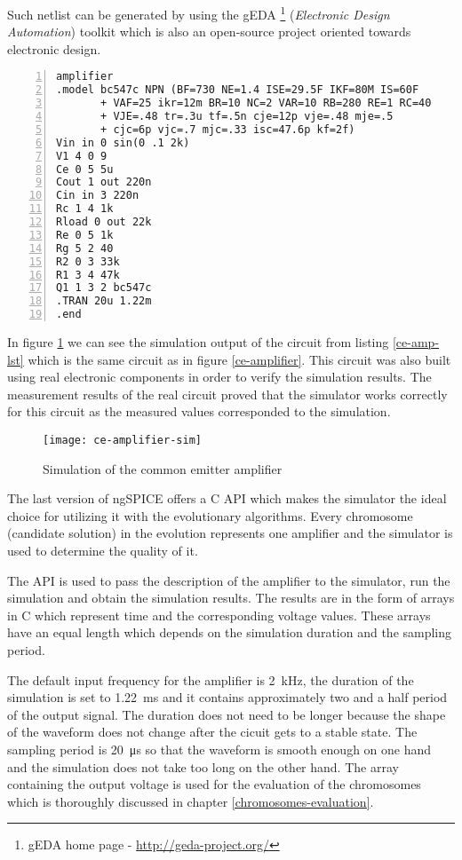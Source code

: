 Such netlist can be generated by using the gEDA \footnote{gEDA home page - \url{http://geda-project.org/}} (\textit{Electronic Design Automation}) toolkit which is also an open-source project oriented towards electronic design.

\begin{lstlisting}[caption={description of the common emitter amplifier using the SPICE syntax},
    label={ce-amp-lst},
    captionpos=b,
    numbers=left]
 amplifier
.model bc547c NPN (BF=730 NE=1.4 ISE=29.5F IKF=80M IS=60F
       + VAF=25 ikr=12m BR=10 NC=2 VAR=10 RB=280 RE=1 RC=40
       + VJE=.48 tr=.3u tf=.5n cje=12p vje=.48 mje=.5
       + cjc=6p vjc=.7 mjc=.33 isc=47.6p kf=2f)
Vin in 0 sin(0 .1 2k)
V1 4 0 9
Ce 0 5 5u
Cout 1 out 220n
Cin in 3 220n
Rc 1 4 1k
Rload 0 out 22k
Re 0 5 1k
Rg 5 2 40
R2 0 3 33k
R1 3 4 47k
Q1 1 3 2 bc547c
.TRAN 20u 1.22m
.end
\end{lstlisting}

In figure \ref{ce-amplifier-sim} we can see the simulation output of the circuit from listing \ref{ce-amp-lst} which is the same circuit as in figure \ref{ce-amplifier}. This circuit was also built using real electronic components in order to verify the simulation results. The measurement results of the real circuit proved that the simulator works correctly for this circuit as the measured values corresponded to the simulation.

\begin{figure}[!ht]
    \centering
    \texttt{[image: ce-amplifier-sim]}\label{ce-amplifier-sim}
    \caption{Simulation of the common emitter amplifier}
\end{figure}

The last version of ngSPICE offers a C API which makes the simulator the ideal choice for utilizing it with the evolutionary algorithms. Every chromosome (candidate solution) in the evolution represents one amplifier and the simulator is used to determine the quality of it.

The API is used to pass the description of the amplifier to the simulator, run the simulation and obtain the simulation results. The results are in the form of arrays in C which represent time and the corresponding voltage values. These arrays have an equal length which depends on the simulation duration and the sampling period.

The default input frequency for the amplifier is \SI{2}{\kilo\hertz}, the duration of the simulation is set to \SI{1.22}{\milli\second} and it contains approximately two and a half period of the output signal. The duration does not need to be longer because the shape of the waveform does not change after the cicuit gets to a stable state. The sampling period is \SI{20}{\micro\second} so that the waveform is smooth enough on one hand and the simulation does not take too long on the other hand. The array containing the output voltage is used for the evaluation of the chromosomes which is thoroughly discussed in chapter \ref{chromosomes-evaluation}.

